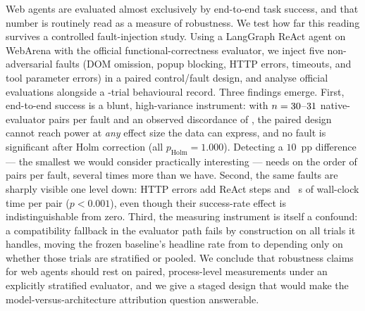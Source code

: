 Web agents are evaluated almost exclusively by end-to-end task success, and that
number is routinely read as a measure of robustness. We test how far this reading
survives a controlled fault-injection study. Using a LangGraph ReAct agent on
WebArena with the official functional-correctness evaluator, we inject five
non-adversarial faults (DOM omission, popup blocking, HTTP errors, timeouts, and
tool parameter errors) in a paired control/fault design, and analyse \OfficialN{}
official evaluations alongside a \TotalTrials{}-trial behavioural record. Three
findings emerge. First, end-to-end success is a blunt, high-variance instrument:
with $n=30$--$31$ native-evaluator pairs per
fault and an observed discordance of \PiDNative{}, the paired design cannot reach
\Power{} power at \emph{any} effect size the data can express, and no fault is
significant after Holm correction (all $p_{\text{Holm}}=1.000$). Detecting a
$10$~pp difference --- the smallest we would consider practically interesting ---
needs on the order of \PairsForTenPPObserved{} pairs per fault, several times more
than we have.
Second, the same faults are sharply visible one level down: HTTP errors add
\ResHttpErrorStepDelta{} ReAct steps and \ResHttpErrorTimeDelta{}~s of wall-clock
time per pair ($p<0.001$), even though their success-rate effect is
indistinguishable from zero. Third, the measuring instrument is itself a confound:
a compatibility fallback in the evaluator path fails by construction on all
\OfficialFallbackN{} trials it handles, moving the frozen baseline's headline rate
from \BaseNativeRate{} to \BasePooledRate{} depending only on whether those trials
are stratified or pooled. We conclude that robustness claims for web agents should
rest on paired, process-level measurements under an explicitly stratified
evaluator, and we give a staged design that would make the
model-versus-architecture attribution question answerable.